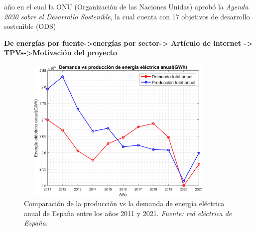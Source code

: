   año en el cual la ONU (Organización de las Naciones Unidas) aprobó la \textit{Agenda 2030 sobre el Desarrollo Sostenible}, la cual cuenta con 17 objetivos de desarrollo sostenible (ODS)

\textbf{De energías por fuente->energías por sector-> Artículo de internet -> TPVs->Motivación del proyecto}

\begin{figure}[H]
	\centering
	\includegraphics[width=10cm, height=7cm]{figuras/ProdcVSdemAnual}
	\caption[Producción vs demanda de energía eléctrica anual]{Comparación de la producción vs la demanda de energía eléctrica anual de España entre los años 2011 y 2021. \textit{Fuente: red eléctrica de España.} }
	\label{fig:prodcvsdemanual}
\end{figure}

\begin{figure}[h]

\end{figure}





